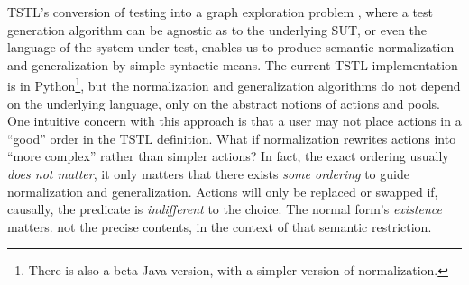TSTL's conversion of testing into a
graph exploration problem \cite{NFM15}, where a test generation
algorithm can be agnostic as to the underlying SUT, or even the
language of the system under test, enables us to produce semantic
normalization and generalization by simple syntactic means.  The current TSTL implementation is
in Python\footnote{There is also a beta Java version, with a
  simpler version of normalization.}, but the
normalization and generalization algorithms do not depend on the
underlying language, only on the abstract notions of actions and
pools.  
One intuitive concern with this approach is that a user may not place
actions in a ``good'' order in the TSTL definition.  What if
normalization rewrites actions into ``more complex'' rather than
simpler actions?  In fact, the exact ordering usually \emph{does not
  matter}, it only matters that there exists \emph{some ordering} to
guide normalization and generalization.  Actions will
only be replaced or swapped if, causally, the predicate is \emph{indifferent}
to the choice.  The normal form's \emph{existence} matters. not the
precise contents, in the context of that semantic restriction.
